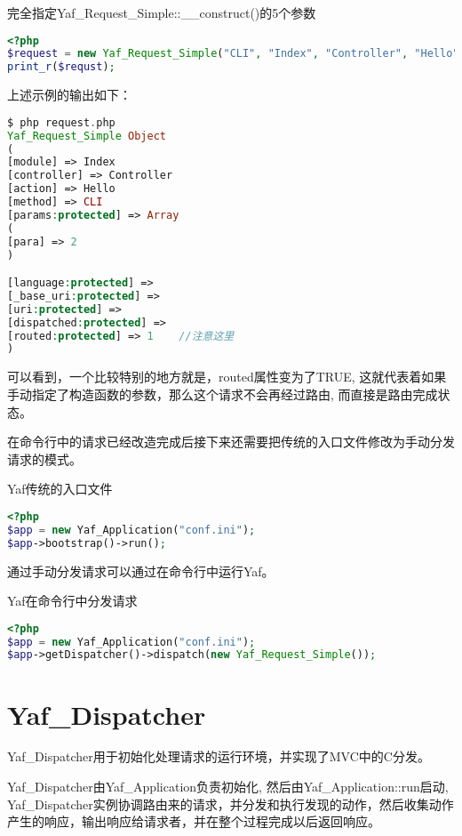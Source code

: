 \begin{example}
完全指定Yaf\_Request\_Simple::\_\_construct()的5个参数
\begin{lstlisting}[language=PHP]
<?php
$request = new Yaf_Request_Simple("CLI", "Index", "Controller", "Hello", array("para" => 2));
print_r($requst);
\end{lstlisting}
\end{example}

上述示例的输出如下：

\begin{lstlisting}[language=PHP]
$ php request.php
Yaf_Request_Simple Object
(
[module] => Index
[controller] => Controller
[action] => Hello
[method] => CLI
[params:protected] => Array
(
[para] => 2
)

[language:protected] =>
[_base_uri:protected] =>
[uri:protected] =>
[dispatched:protected] =>
[routed:protected] => 1    //注意这里
)
\end{lstlisting}

可以看到，一个比较特别的地方就是，routed属性变为了TRUE, 这就代表着如果手动指定了构造函数的参数，那么这个请求不会再经过路由, 而直接是路由完成状态。

在命令行中的请求已经改造完成后接下来还需要把传统的入口文件修改为手动分发请求的模式。

\begin{example}
Yaf传统的入口文件
\begin{lstlisting}[language=PHP]
<?php
$app = new Yaf_Application("conf.ini");
$app->bootstrap()->run();
\end{lstlisting}
\end{example}

通过手动分发请求可以通过在命令行中运行Yaf。

\begin{example}
Yaf在命令行中分发请求
\begin{lstlisting}[language=PHP]
<?php
$app = new Yaf_Application("conf.ini");
$app->getDispatcher()->dispatch(new Yaf_Request_Simple());
\end{lstlisting}
\end{example}


\chapter{Yaf\_Dispatcher}

Yaf\_Dispatcher用于初始化处理请求的运行环境，并实现了MVC中的C分发。

Yaf\_Dispatcher由Yaf\_Application负责初始化, 然后由Yaf\_Application::run启动, Yaf\_Dispatcher实例协调路由来的请求，并分发和执行发现的动作，然后收集动作产生的响应，输出响应给请求者，并在整个过程完成以后返回响应。


